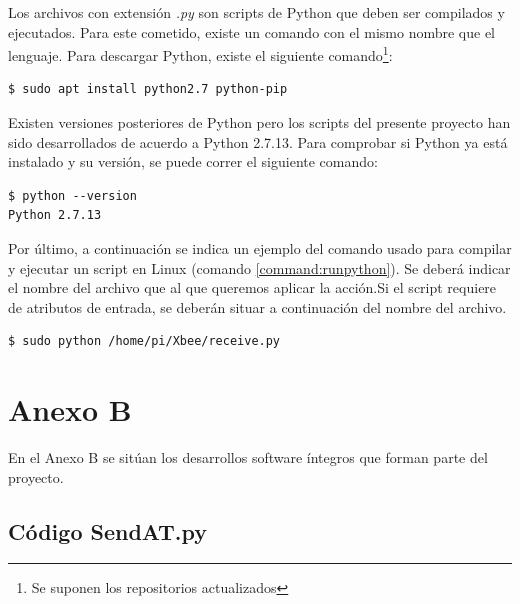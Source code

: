Los archivos con extensión \textit{.py} son scripts de Python que deben ser compilados y ejecutados. Para este cometido, existe un comando con el mismo nombre que el lenguaje. Para descargar Python, existe el siguiente comando\footnote{Se suponen los repositorios actualizados}:

\begin{lstlisting}[frame=single, label=command:installpython]
$ sudo apt install python2.7 python-pip
\end{lstlisting} 

Existen versiones posteriores de Python pero los scripts del presente proyecto han sido desarrollados de acuerdo a Python 2.7.13. Para comprobar si Python ya está instalado y su versión, se puede correr el siguiente comando:

\begin{lstlisting}[frame=single, label=command:checkpython]
$ python --version
Python 2.7.13
\end{lstlisting} 

Por último, a continuación se indica un ejemplo del comando usado para compilar y ejecutar un script en Linux (comando \ref{command:runpython}). Se deberá indicar el nombre del archivo que  al que queremos aplicar la acción.Si el script requiere de atributos de entrada, se deberán situar a continuación del nombre del archivo.

\begin{lstlisting}[frame=single, label=command:runpython]
$ sudo python /home/pi/Xbee/receive.py
\end{lstlisting} 

\chapter{Anexo B}\label{anexo:b}

En el Anexo B se sitúan los desarrollos software íntegros que forman parte del proyecto.


\section{Código SendAT.py}\label{anexo:sendAT}

